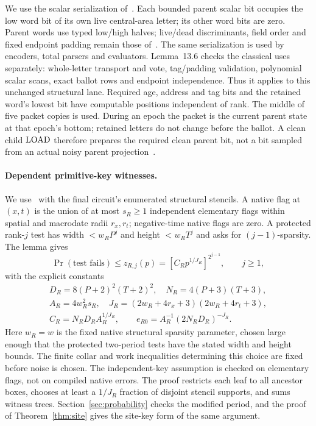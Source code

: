 We use the scalar serialization of~\cite[Lemma~13.6]{DMMemory2026}. Each bounded parent scalar bit occupies the low word bit of its own live central-area letter; its other word bits are zero. Parent words use typed low/high halves; live/dead discriminants, field order and fixed endpoint padding remain those of~\cite[Section~3.3]{DMNoise1D2026}. The same serialization is used by encoders, total parsers and evaluators. Lemma~13.6 checks the classical uses separately: whole-letter transport and vote, tag/padding validation, polynomial scalar scans, exact ballot rows and endpoint independence. Thus it applies to this unchanged structural lane. Required age, address and tag bits and the retained word's lowest bit have computable positions independent of rank. The middle of five packet copies is used. During an epoch the packet is the current parent state at that epoch's bottom; retained letters do not change before the ballot. A clean child $\operatorname{LOAD}$ therefore prepares the required clean parent bit, not a bit sampled from an actual noisy parent projection~\cite[Lemma~13.3]{DMMemory2026}.
\paragraph{Dependent primitive-key witnesses.}
We use~\cite[Lemma~12.1]{DMMemory2026} with the final circuit's enumerated structural stencils. A native flag at $(x,t)$ is the union of at most $s_R\ge1$ independent elementary flags within spatial and macrodate radii $r_x,r_t$; negative-time native flags are zero. A protected rank-$j$ test has width $<w_RP^j$ and height $<w_RT^j$ and asks for $(j-1)$-sparsity. The lemma gives
\begin{equation}\label{eq:witness}
 \Pr(\text{test fails})\le z_{R,j}(p)
  =[C_Rp^{1/J_R}]^{2^{j-1}},\qquad j\ge1,
\end{equation}
with the explicit constants
\begin{equation}\label{eq:Rconstants}
\begin{gathered}
 D_R=8(P+2)^2(T+2)^2,\quad N_R=4(P+3)(T+3),\\
 A_R=4w_R^2s_R,\quad
 J_R=(2w_R+4r_x+3)(2w_R+4r_t+3),\\
 C_R=N_RD_RA_R^{1/J_R},\qquad
 e_{R0}=A_R^{-1}(2N_RD_R)^{-J_R}.
\end{gathered}
\end{equation}
Here $w_R=w$ is the fixed native structural sparsity parameter, chosen large enough that the protected two-period tests have the stated width and height bounds. The finite collar and work inequalities determining this choice are fixed before noise is chosen. The independent-key assumption is checked on elementary flags, not on compiled native errors. The proof restricts each leaf to all ancestor boxes, chooses at least a $1/J_R$ fraction of disjoint stencil supports, and sums witness trees. Section~\ref{sec:probability} checks the modified period, and the proof of Theorem~\ref{thm:site} gives the site-key form of the same argument.

